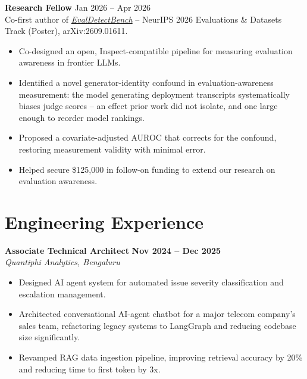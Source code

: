 \documentclass[11pt,a4paper]{article}
\begin{document}
\vspace{4pt}
\textbf{Research Fellow} \hfill Jan 2026 -- Apr 2026 \\[1pt]
Co-first author of \href{https://arxiv.org/abs/2609.01611}{\textit{EvalDetectBench}} -- NeurIPS 2026 Evaluations \& Datasets Track (Poster), arXiv:2609.01611.
\begin{itemize}[leftmargin=*, nosep]
\item Co-designed an open, Inspect-compatible pipeline for measuring evaluation awareness in frontier LLMs.
\item Identified a novel generator-identity confound in evaluation-awareness measurement: the model generating deployment transcripts systematically biases judge scores -- an effect prior work did not isolate, and one large enough to reorder model rankings.
\item Proposed a covariate-adjusted AUROC that corrects for the confound, restoring measurement validity with minimal error.
\item Helped secure \$125,000 in follow-on funding to extend our research on evaluation awareness.
\end{itemize}

\section{Engineering Experience}

\textbf{Associate Technical Architect} \hfill \textbf{Nov 2024 -- Dec 2025} \\
\textit{Quantiphi Analytics, Bengaluru}
\begin{itemize}[leftmargin=*, nosep]
\item Designed AI agent system for automated issue severity classification and escalation management.
\item Architected conversational AI-agent chatbot for a major telecom company's sales team, refactoring legacy systems to LangGraph and reducing codebase size significantly.
\item Revamped RAG data ingestion pipeline, improving retrieval accuracy by 20\% and reducing time to first token by 3x.
\end{itemize}
\end{document}
